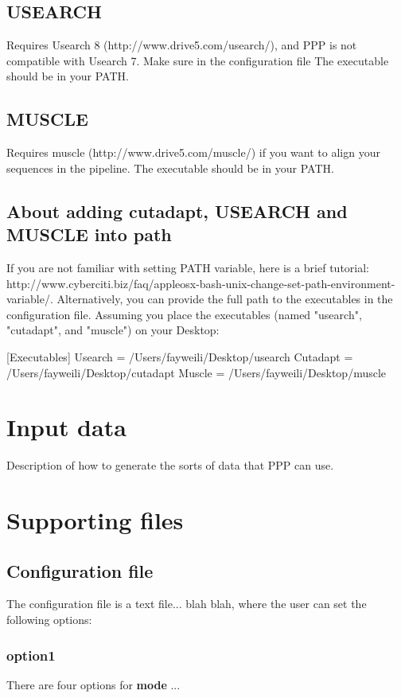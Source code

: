 \documentclass[12pt,letterpaper]{article}
\begin{document}
\subsection{USEARCH}
Requires Usearch 8 (http://www.drive5.com/usearch/), and PPP is not compatible with Usearch 7. Make sure in the configuration file
The executable should be in your PATH.

\subsection{MUSCLE}
Requires muscle (http://www.drive5.com/muscle/) if you want to align your sequences in the pipeline. The executable should be in your PATH.

\subsection{About adding cutadapt, USEARCH and MUSCLE into path}
If you are not familiar with setting PATH variable, here is a brief tutorial: http://www.cyberciti.biz/faq/appleosx-bash-unix-change-set-path-environment-variable/. Alternatively, you can provide the full path to the executables in the configuration file. Assuming you place the executables (named "usearch", "cutadapt", and "muscle") on your Desktop:

[Executables]
Usearch 		= /Users/fayweili/Desktop/usearch				
Cutadapt		= /Users/fayweili/Desktop/cutadapt
Muscle 		= /Users/fayweili/Desktop/muscle		


\bigskip\section{Input data}
Description of how to generate the sorts of data that PPP can use.

\bigskip\section{Supporting files}
\subsection{Configuration file}
The configuration file is a text file... blah blah, where the user can
set the following options:

\subsubsection{option1} %
There are four options for \textbf{mode} ... 
\end{document}
